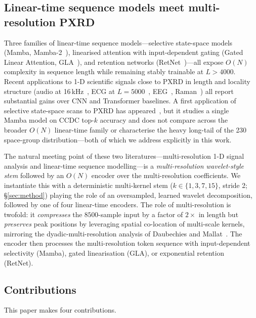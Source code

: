 \documentclass[final]{ws-ijwmip}
\begin{document}
\subsection{Linear-time sequence models meet multi-resolution PXRD}

Three families of linear-time sequence models---selective state-space
models (Mamba, Mamba-2~\cite{gu2024mamba2}), linearised attention with
input-dependent gating (Gated Linear Attention,
GLA~\cite{yang2023gla}), and retention networks
(RetNet~\cite{sun2023retnet})---all expose $O(N)$ complexity in sequence
length while remaining stably trainable at $L>4000$. Recent applications
to 1-D scientific signals close to PXRD in length and locality structure
(audio at 16\,kHz~\cite{erol2024audiomamba}, ECG at
$L\!=\!5000$~\cite{anonymous2025ecgmamba},
EEG~\cite{anonymous2025eegm2}, Raman~\cite{anonymous2025mrsmamba}) all
report substantial gains over CNN and Transformer baselines. A first
application of selective state-space scans to PXRD has
appeared~\cite{yu2024xrdmamba}, but it studies a single Mamba model on
CCDC top-$k$ accuracy and does not compare across the broader $O(N)$
linear-time family or characterise the heavy long-tail of the 230
space-group distribution---both of which we address explicitly in
this work.

The natural meeting point of these two literatures---multi-resolution 1-D
signal analysis and linear-time sequence modelling---is a
\emph{multi-resolution wavelet-style stem} followed by an $O(N)$ encoder
over the multi-resolution coefficients. We instantiate this with a
deterministic multi-kernel stem
($k\in\{1,3,7,15\}$, stride 2; \S\ref{sec:method}) playing the role of an
oversampled, learned wavelet decomposition, followed by one of four
linear-time encoders. The role of multi-resolution is twofold: it
\emph{compresses} the $8500$-sample input by a factor of $2\times$ in
length but \emph{preserves} peak positions by leveraging spatial
co-location of multi-scale kernels, mirroring the dyadic-multi-resolution
analysis of Daubechies and Mallat~\cite{daubechies1992,mallat1999}. The
encoder then processes the multi-resolution token sequence with
input-dependent selectivity (Mamba), gated linearisation (GLA), or
exponential retention (RetNet).


\subsection{Contributions}

This paper makes four contributions.
\end{document}
